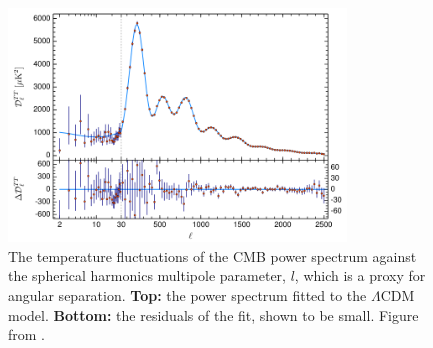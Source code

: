 \begin{figure}%
    \centering
    \includegraphics[width=0.8\textwidth]{Figures/DarkMatterEvidence/bao.png}
    \caption[Temperature fluctuations of the CMB spectrum as a function of $l$]{The temperature fluctuations of the CMB power spectrum against the spherical harmonics multipole parameter, $l$, which is a proxy for angular separation.
             \textbf{Top:} the power spectrum fitted to the $\Lambda$CDM model.
             \textbf{Bottom:} the residuals of the fit, shown to be small.
             Figure from \cite{plank_result_ref}.}
    \label{fig:DM_Evidence_BAO}
\end{figure}
